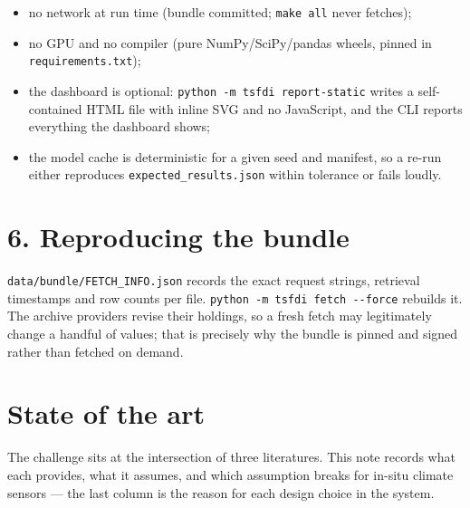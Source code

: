 \documentclass[10pt,a4paper]{article}
\begin{document}
\begin{itemize}
\item no network at run time (bundle committed; \texttt{make all} never fetches);
\item no GPU and no compiler (pure NumPy/\allowbreak{}SciPy/\allowbreak{}pandas wheels, pinned in
\texttt{requirements.txt});

\item the dashboard is optional: \texttt{python -\allowbreak{}m tsfdi report-\allowbreak{}static} writes a
self-\allowbreak{}contained HTML file with inline SVG and no JavaScript, and the CLI reports everything the dashboard shows;

\item the model cache is deterministic for a given seed and manifest, so a re-\allowbreak{}run
either reproduces \texttt{expected\_\allowbreak{}results.json} within tolerance or fails loudly.

\end{itemize}

\section*{6. Reproducing the bundle}
\texttt{data/\allowbreak{}bundle/\allowbreak{}FETCH\_\allowbreak{}INFO.json} records the exact request strings, retrieval timestamps and row counts per file. \texttt{python -\allowbreak{}m tsfdi fetch -\allowbreak{}-\allowbreak{}force} rebuilds it. The archive providers revise their holdings, so a fresh fetch may legitimately change a handful of values; that is precisely why the bundle is pinned and signed rather than fetched on demand.

\clearpage
\section*{State of the art}
The challenge sits at the intersection of three literatures. This note records what each provides, what it assumes, and which assumption breaks for in-\allowbreak{}situ climate sensors — the last column is the reason for each design choice in the system.
\end{document}
